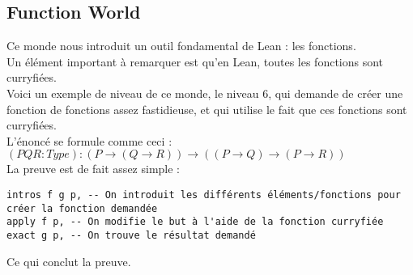 \subsection{Function World}
Ce monde nous introduit un outil fondamental de Lean : les fonctions. \\
Un élément important à remarquer est qu'en Lean, toutes les fonctions sont curryfiées.\\

Voici un exemple de niveau de ce monde, le niveau 6, qui demande de créer une fonction de fonctions assez fastidieuse, et qui utilise le fait que ces fonctions sont curryfiées. \\
L'énoncé se formule comme ceci : \\
$(P Q R : Type) : (P \to (Q \to R)) \to ((P \to Q) \to (P \to R))$\\
La preuve est de fait assez simple : \\
\begin{verbatim}
intros f g p, -- On introduit les différents éléments/fonctions pour créer la fonction demandée 
apply f p, -- On modifie le but à l'aide de la fonction curryfiée 
exact g p, -- On trouve le résultat demandé 
\end{verbatim}
Ce qui conclut la preuve.\\

